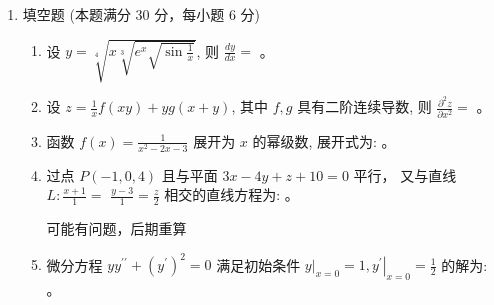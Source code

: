 
\begin{enumerate}
	\item
	填空题 (本题满分 30 分，每小题 6 分)
	\begin{enumerate}
		\item
		设 $y=\sqrt[4]{x \sqrt[3]{e^{x} \sqrt{\sin \frac{1}{x}}}}$, 则 $\frac{d y}{d x}=$   。
		\item  
设 $z=\frac{1}{x} f(x y)+y g(x+y)$, 其中 $f, g$ 具有二阶连续导数, 则 $\frac{\partial^{2} z}{\partial x^{2}}=$    。
		
		
		\item
		函数 $f(x)=\frac{1}{x^{2}-2 x-3}$ 展开为 $x$ 的幂级数, 展开式为:  。



\item
过点 $P(-1,0,4)$ 且与平面 $3 x-4 y+z+10=0$ 平行， 又与直线 $L: \frac{x+1}{1}=$ $\frac{y-3}{1}=\frac{z}{2}$ 相交的直线方程为:    。
\begin{note}
	可能有问题，后期重算
\end{note}

\item
微分方程 $y y^{\prime\prime}+\left(y^{\prime}\right)^{2}=0$ 满足初始条件 $\left.y\right|_{x=0}=1,\left.y^{\prime}\right|_{x=0}=\frac{1}{2}$ 的解为:  
 。
		

\end{enumerate}
\end{enumerate}

